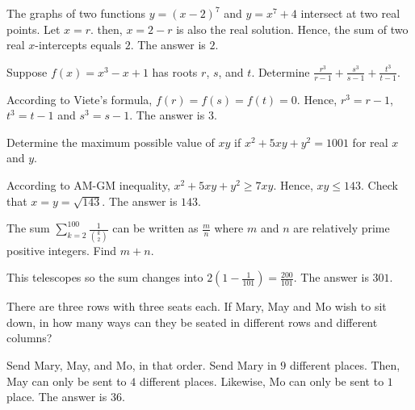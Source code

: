 \begin{solution}
The graphs of two functions $y=(x-2)^7$ and $y=x^7+4$ intersect at two real points. Let $x=r$. then, $x=2-r$ is also the real solution. Hence, the sum of two real $x$-intercepts equals $2$. The answer is $2$.
\end{solution}

\begin{problem}
Suppose $f(x)=x^3-x+1$ has roots $r$, $s$, and $t$. Determine $\frac{r^3}{r-1}+\frac{s^3}{s-1}+\frac{t^3}{t-1}$.
\end{problem}

\begin{solution}
According to Viete's formula, $f(r)=f(s)=f(t)=0$. Hence, $r^3=r-1$, $t^3=t-1$ and $s^3=s-1$. The answer is $3$. 
\end{solution}

\begin{problem}
Determine the maximum possible value of $xy$ if $x^2+5xy+y^2=1001$ for real $x$ and $y$.
\end{problem}

\begin{solution}
According to AM-GM inequality, $x^2+5xy+y^2\geq 7xy$. Hence, $xy\leq 143$. Check that $x=y=\sqrt{143}$. The answer is $143$.
\end{solution}

\begin{problem}
The sum $\sum_{k=2}^{100}\frac{1}{\binom{k}{2}}$ can be written as $\frac{m}{n}$ where $m$ and $n$ are relatively prime positive integers. Find $m+n$.
\end{problem}

\begin{solution}
This telescopes so the sum changes into $2(1-\frac{1}{101})=\frac{200}{101}$. The answer is $301$.
\end{solution}

\begin{problem}
There are three rows with three seats each. If Mary, May and Mo wish to sit down, in how many ways can they be seated in different rows and different columns?
\end{problem}

\begin{solution}
Send Mary, May, and Mo, in that order. Send Mary in $9$ different places. Then, May can only be sent to $4$ different places. Likewise, Mo can only be sent to $1$ place. The answer is $36$.
\end{solution}

